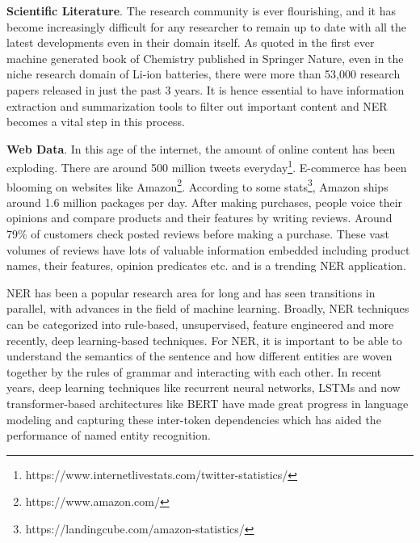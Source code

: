 \textbf{Scientific Literature}. The research community is ever flourishing, and it has become increasingly difficult for any researcher to remain up to date with all the latest developments even in their domain itself. As quoted in the first ever machine generated book of Chemistry published in Springer Nature\cite{writer2019lithium}, even in the niche research domain of Li-ion batteries, there were more than 53,000 research papers released in just the past 3 years. It is hence essential to have information extraction and summarization tools to filter out important content and NER becomes a vital step in this process.

\textbf{Web Data}. In this age of the internet, the amount of online content has been exploding. There are around 500 million tweets everyday\footnote{https://www.internetlivestats.com/twitter-statistics/}. E-commerce has been blooming on websites like Amazon\footnote{https://www.amazon.com/}. According to some stats\footnote{https://landingcube.com/amazon-statistics/}, Amazon ships around 1.6 million packages per day. After making purchases, people voice their opinions and compare products and their features by writing reviews. Around 79\% of customers check posted reviews before making a purchase. These vast volumes of reviews have lots of valuable information embedded including product names, their features, opinion predicates etc. and is a trending NER application.

NER has been a popular research area for long and has seen transitions in parallel, with advances in the field of machine learning. Broadly, NER techniques can be categorized into rule-based, unsupervised, feature engineered and more recently, deep learning-based techniques. For NER, it is important to be able to understand the semantics of the sentence and how different entities are woven together by the rules of grammar and interacting with each other. In recent years, deep learning techniques like recurrent neural networks, LSTMs\cite{hochreiter1997long} and now transformer-based\cite{vaswani2017attention} architectures like BERT\cite{devlin2018bert} have made great progress in language modeling and capturing these inter-token dependencies which has aided the performance of named entity recognition. 

    
